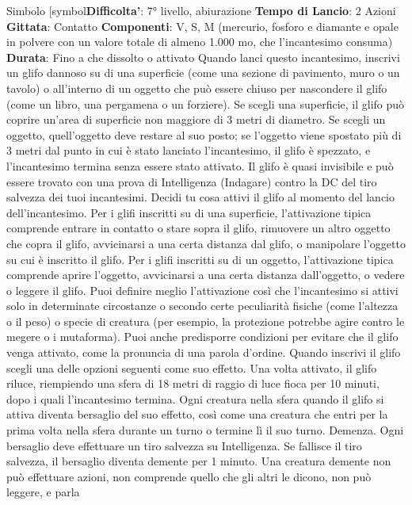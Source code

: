 \begin{multicols}{2}
Simbolo
[symbol\textbf{Difficolta'}:
7° livello, abiurazione
\textbf{Tempo di Lancio}: 2 Azioni
\textbf{Gittata}: Contatto
\textbf{Componenti}: V, S, M (mercurio, fosforo e diamante e
opale in polvere con un valore totale di almeno 1.000
mo, che l’incantesimo consuma)
\textbf{Durata}: Fino a che dissolto o attivato
Quando lanci questo incantesimo, inscrivi un glifo
dannoso su di una superficie (come una sezione di
pavimento, muro o un tavolo) o all’interno di un oggetto
che può essere chiuso per nascondere il glifo (come un
libro, una pergamena o un forziere). Se scegli una
superficie, il glifo può coprire un’area di superficie non
maggiore di 3 metri di diametro. Se scegli un oggetto,
quell’oggetto deve restare al suo posto; se l’oggetto 
viene spostato più di 3 metri dal punto in cui è stato
lanciato l’incantesimo, il glifo è spezzato, e
l’incantesimo termina senza essere stato attivato.
Il glifo è quasi invisibile e può essere trovato con una
prova di Intelligenza (Indagare) contro la DC del tiro
salvezza dei tuoi incantesimi.
Decidi tu cosa attivi il glifo al momento del lancio
dell’incantesimo.
Per i glifi inscritti su di una superficie, l’attivazione tipica
comprende entrare in contatto o stare sopra il glifo,
rimuovere un altro oggetto che copra il glifo, avvicinarsi
a una certa distanza dal glifo, o manipolare l’oggetto su
cui è inscritto il glifo.
Per i glifi inscritti su di un oggetto, l’attivazione tipica
comprende aprire l’oggetto, avvicinarsi a una certa
distanza dall’oggetto, o vedere o leggere il glifo.
Puoi definire meglio l’attivazione così che l’incantesimo
si attivi solo in determinate circostanze o secondo certe
peculiarità fisiche (come l’altezza o il peso) o specie di
creatura (per esempio, la protezione potrebbe agire
contro le megere o i mutaforma). Puoi anche
predisporre condizioni per evitare che il glifo venga
attivato, come la pronuncia di una parola d’ordine.
Quando inscrivi il glifo scegli una delle opzioni seguenti
come suo effetto. Una volta attivato, il glifo riluce,
riempiendo una sfera di 18 metri di raggio di luce fioca
per 10 minuti, dopo i quali l’incantesimo termina. Ogni
creatura nella sfera quando il glifo si attiva diventa
bersaglio del suo effetto, così come una creatura che
entri per la prima volta nella sfera durante un turno o
termine lì il suo turno.
Demenza. Ogni bersaglio deve effettuare un tiro
salvezza su Intelligenza. Se fallisce il tiro salvezza, il
bersaglio diventa demente per 1 minuto. Una creatura
demente non può effettuare azioni, non comprende
quello che gli altri le dicono, non può leggere, e parla

\end{multicols}
